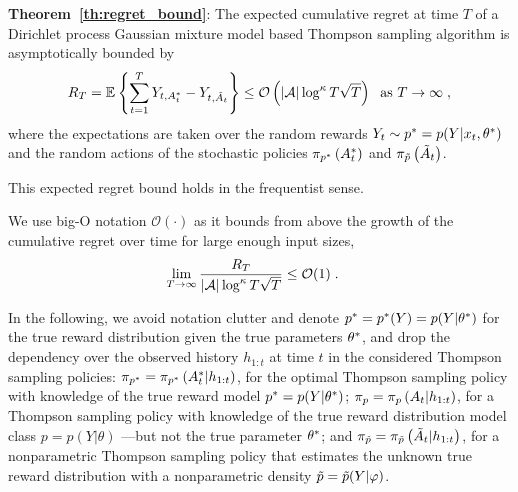 \textbf{Theorem~\ref{th:regret_bound}}:
The expected cumulative regret at time $T$ of a Dirichlet process Gaussian mixture model based Thompson sampling algorithm is asymptotically bounded by
	\begin{equation}
	R_T	=\mathbb{E}_{}\left\{ \sum_{t=1}^T Y_{t,A^*_t}-Y_{t,\tilde{A}_t}  \right\} \leq \mathcal{O}\left(|\mathcal{A}| \log^\kappa T \sqrt{T} \right) \; \text{ as } T \rightarrow \infty \;,
	\end{equation}
	where the expectations are taken over the random rewards $Y_t\sim p^*=p(Y|x_t,\theta^*)$ and the random actions of the stochastic policies $\pi_{p^*}\left( A^*_t \right)$ and $\pi_{\tilde{p}}\left( \tilde{A}_t \right)$.
	
	This expected regret bound holds in the frequentist sense.

	We use big-O notation $\mathcal{O}(\cdot)$ as it bounds from above the growth of the cumulative regret over time for large enough input sizes, \ie
\begin{align}
\lim_{T\rightarrow \infty} \frac{R_T}{|\mathcal{A}| \log^\kappa T \sqrt{T} } & \leq \mathcal{O}(1)\; .
\end{align}

In the following, we avoid notation clutter and denote $p^*=p^*(Y)=p(Y|\theta^*)$ for the true reward distribution given the true parameters $\theta^*$, and drop the dependency over the observed history $h_{1:t}$ at time $t$ in the considered Thompson sampling policies: 
$\pi_{p^*}=\pi_{p^*}\left( A^*_t|h_{1:t} \right)$, for the optimal Thompson sampling policy with knowledge of the true reward model $p^*=p(Y|\theta^*)$;
$\pi_{p}= \pi_{p}\left( A_t|h_{1:t} \right)$, for a Thompson sampling policy with knowledge of the true reward distribution model class $p=p(Y|\theta)$ ---but not the true parameter $\theta^*$; and 
$\pi_{\tilde{p}}=\pi_{\tilde{p}}\left( \tilde{A}_t|h_{1:t} \right)$, for a nonparametric Thompson sampling policy that estimates the unknown true reward distribution with a nonparametric density $\tilde{p}=\tilde{p}(Y|\varphi)$.


